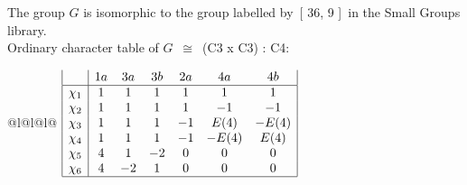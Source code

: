 \documentclass[varwidth=\maxdimen,border=10]{standalone}
\begin{document}
The group $G$ is isomorphic to the group labelled by\ [ 36, 9 ]\ in the Small Groups library.\\
Ordinary character table of $G$\ $\cong$\ (C3 x C3) : C4:\\
\begin{center}
\begin{tabular}{@{}l@{}l@{}l@{}}
\hline
\(\begin{array}{|l|cccccc|}
  & 1a & 3a & 3b & 2a & 4a & 4b\\ \hline
\chi_{1} & 1 & 1 & 1 & 1 & 1 & 1\\
\chi_{2} & 1 & 1 & 1 & 1 & -1 & -1\\
\chi_{3} & 1 & 1 & 1 & -1 & E(4) & -E(4)\\
\chi_{4} & 1 & 1 & 1 & -1 & -E(4) & E(4)\\
\chi_{5} & 4 & 1 & -2 & 0 & 0 & 0\\
\chi_{6} & 4 & -2 & 1 & 0 & 0 & 0\\
\hline
\end{array}\)\\
\end{tabular}
\end{center}
\end{document}
